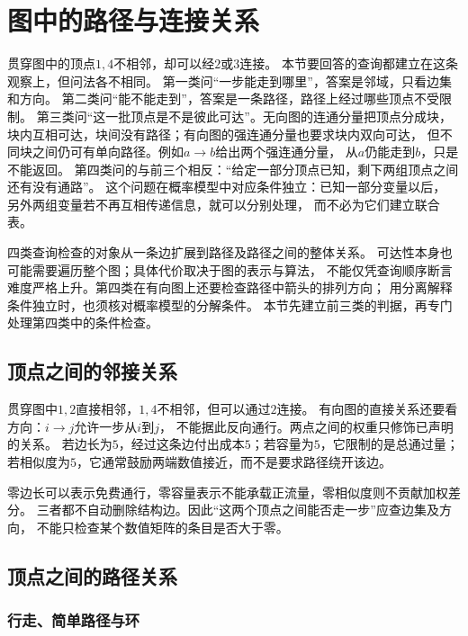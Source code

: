 \section{图中的路径与连接关系}
\label{sec:graph-theory-paths-traversal}

贯穿图中的顶点\(1,4\)不相邻，却可以经\(2\)或\(3\)连接。
本节要回答的查询都建立在这条观察上，但问法各不相同。
第一类问“一步能走到哪里”，答案是邻域，只看边集和方向。
第二类问“能不能走到”，答案是一条路径，路径上经过哪些顶点不受限制。
第三类问“这一批顶点是不是彼此可达”。无向图的连通分量把顶点分成块，
块内互相可达，块间没有路径；有向图的强连通分量也要求块内双向可达，
但不同块之间仍可有单向路径。例如\(a\to b\)给出两个强连通分量，
从\(a\)仍能走到\(b\)，只是不能返回。
第四类问的与前三个相反：“给定一部分顶点已知，剩下两组顶点之间还有没有通路”。
这个问题在概率模型中对应条件独立：已知一部分变量以后，
另外两组变量若不再互相传递信息，就可以分别处理，
而不必为它们建立联合表。

四类查询检查的对象从一条边扩展到路径及路径之间的整体关系。
可达性本身也可能需要遍历整个图；具体代价取决于图的表示与算法，
不能仅凭查询顺序断言难度严格上升。第四类在有向图上还要检查路径中箭头的排列方向；
用分离解释条件独立时，也须核对概率模型的分解条件。
本节先建立前三类的判据，再专门处理第四类中的条件检查。

\subsection{顶点之间的邻接关系}

贯穿图中\(1,2\)直接相邻，\(1,4\)不相邻，但可以通过\(2\)连接。
有向图的直接关系还要看方向：\(i\to j\)允许一步从\(i\)到\(j\)，
不能据此反向通行。两点之间的权重只修饰已声明的关系。
若边长为\(5\)，经过这条边付出成本\(5\)；若容量为\(5\)，它限制的是总通过量；
若相似度为\(5\)，它通常鼓励两端数值接近，而不是要求路径绕开该边。

零边长可以表示免费通行，零容量表示不能承载正流量，零相似度则不贡献加权差分。
三者都不自动删除结构边。因此“这两个顶点之间能否走一步”应查边集及方向，
不能只检查某个数值矩阵的条目是否大于零。

\subsection{顶点之间的路径关系}

\subsubsection{行走、简单路径与环}

